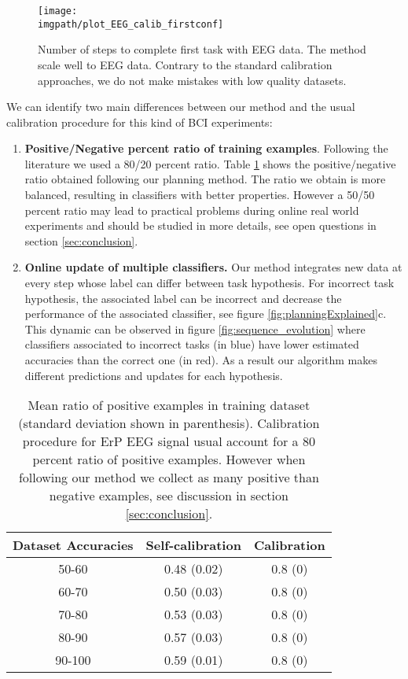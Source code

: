 \begin{figure}[!ht]
\centering
\texttt{[image: \\imgpath/plot\_EEG\_calib\_firstconf]}
\caption{Number of steps to complete first task with EEG data. The method scale well to EEG data. Contrary to the standard calibration approaches, we do not make mistakes with low quality datasets.}
\label{fig:firstEEG}
\end{figure} 

We can identify two main differences between our method and the usual calibration procedure for this kind of BCI experiments:
\begin{enumerate}
\item \textbf{Positive/Negative percent ratio of training examples}. Following the literature \cite{chavarriaga2010learning, iturrate2013task} we used a 80/20 percent ratio. Table \ref{tab:correctLabelRatio} shows the positive/negative ratio obtained following our planning method. The ratio we obtain is more balanced, resulting in classifiers with better properties. However a 50/50 percent ratio may lead to practical problems during online real world experiments and should be studied in more details, see open questions in section \ref{sec:conclusion}.
\item \textbf{Online update of multiple classifiers.} Our method integrates new data at every step whose label can differ between task hypothesis. For incorrect task hypothesis, the associated label can be incorrect and decrease the performance of the associated classifier, see figure \ref{fig:planningExplained}c. This dynamic can be observed in figure \ref{fig:sequence_evolution} where classifiers associated to incorrect tasks (in blue) have lower estimated accuracies than the correct one (in red). As a result our algorithm makes different predictions and updates for each hypothesis.
\end{enumerate}

\begin{table}
\begin{tabular}{c c c}
Dataset Accuracies & Self-calibration & Calibration \\ \hline
50-60 & 0.48 (0.02) & 0.8 (0) \\
60-70 & 0.50 (0.03) & 0.8 (0) \\
70-80 & 0.53 (0.03) & 0.8 (0) \\
80-90 & 0.57 (0.03) & 0.8 (0) \\
90-100 & 0.59 (0.01) & 0.8 (0) \\
\end{tabular}
\caption{Mean ratio of positive examples in training dataset (standard deviation shown in parenthesis). Calibration procedure for ErP EEG signal usual account for a 80 percent ratio of positive examples. However when following our method we collect as many positive than negative examples, see discussion in section \ref{sec:conclusion}.}
\label{tab:correctLabelRatio}
\end{table}


